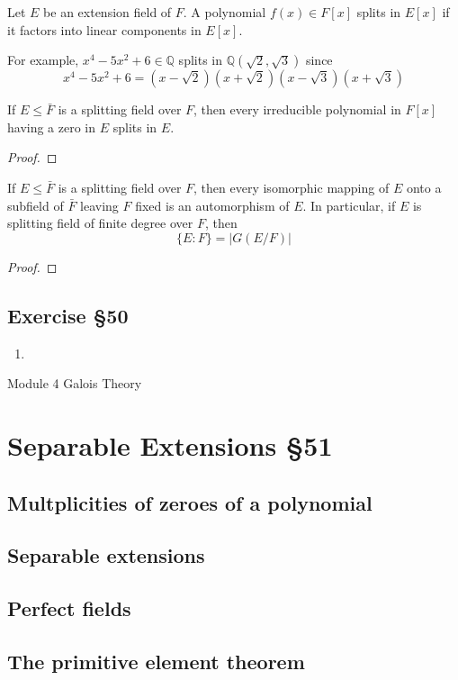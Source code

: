 \begin{definition}
	Let $E$ be an extension field of $F$.
	A polynomial $f(x) \in F[x]$ splits in $E[x]$ if it factors into linear components in $E[x]$.
\end{definition}
For example, $x^4-5x^2+6 \in \mathbb{Q}$ splits in $\mathbb{Q}(\sqrt{2},\sqrt{3})$ since 
\[ x^4-5x^2+6 = (x-\sqrt{2})(x+\sqrt{2})(x-\sqrt{3})(x+\sqrt{3}) \]

\begin{corollary}
	If $E \le \bar{F}$ is a splitting field over $F$, then every irreducible polynomial in $F[x]$ having a zero in $E$ splits in $E$.
\end{corollary}
\begin{proof}
\end{proof}

\begin{corollary}
	If $E \le \bar{F}$ is a splitting field over $F$, then every isomorphic mapping of $E$ onto a subfield of $\bar{F}$ leaving $F$ fixed is an automorphism of $E$.
	In particular, if $E$ is splitting field of finite degree over $F$, then
	\[ \{ E : F \} = |G(E/F)| \]
\end{corollary}
\begin{proof}
\end{proof}
\subsection{Exercise \S50}
\begin{enumerate}
	\item
\end{enumerate}

\pagebreak
{\Large Module 4 Galois Theory}
\section{Separable Extensions \S51}
\subsection{Multplicities of zeroes of a polynomial}
\subsection{Separable extensions}
\subsection{Perfect fields}
\subsection{The primitive element theorem}
